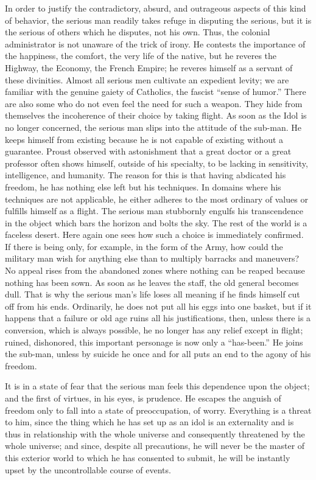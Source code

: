 \documentclass[11pt]{article}
\begin{document}
In order to justify the contradictory, absurd, and outrageous aspects of this kind of behavior, the serious man readily takes refuge in disputing the serious, but it is the serious of others which he disputes, not his own. Thus, the colonial administrator is not unaware of the trick of irony. He contests the importance of the happiness, the comfort, the very life of the native, but he reveres the Highway, the Economy, the French Empire; he reveres himself as a servant of these divinities. Almost all serious men cultivate an expedient levity; we are familiar with the genuine gaiety of Catholics, the fascist “sense of humor.” There are also some who do not even feel the need for such a weapon. They hide from themselves the incoherence of their choice by taking flight. As soon as the Idol is no longer concerned, the serious man slips into the attitude of the sub-man. He keeps himself from existing because he is not capable of existing without a guarantee. Proust observed with astonishment that a great doctor or a great professor often shows himself, outside of his specialty, to be lacking in sensitivity, intelligence, and humanity. The reason for this is that having abdicated his freedom, he has nothing else left but his techniques. In domains where his techniques are not applicable, he either adheres to the most ordinary of values or fulfills himself as a flight. The serious man stubbornly engulfs his transcendence in the object which bars the horizon and bolts the sky. The rest of the world is a faceless desert. Here again one sees how such a choice is immediately confirmed. If there is being only, for example, in the form of the Army, how could the military man wish for anything else than to multiply barracks and maneuvers? No appeal rises from the abandoned zones where nothing can be reaped because nothing has been sown. As soon as he leaves the staff, the old general becomes dull. That is why the serious man’s life loses all meaning if he finds himself cut off from his ends. Ordinarily, he does not put all his eggs into one basket, but if it happens that a failure or old age ruins all his justifications, then, unless there is a conversion, which is always possible, he no longer has any relief except in flight; ruined, dishonored, this important personage is now only a “has-been.” He joins the sub-man, unless by suicide he once and for all puts an end to the agony of his freedom.

It is in a state of fear that the serious man feels this dependence upon the object; and the first of virtues, in his eyes, is prudence. He escapes the anguish of freedom only to fall into a state of preoccupation, of worry. Everything is a threat to him, since the thing which he has set up as an idol is an externality and is thus in relationship with the whole universe and consequently threatened by the whole universe; and since, despite all precautions, he will never be the master of this exterior world to which he has consented to submit, he will be instantly upset by the uncontrollable course of events.
\end{document}
